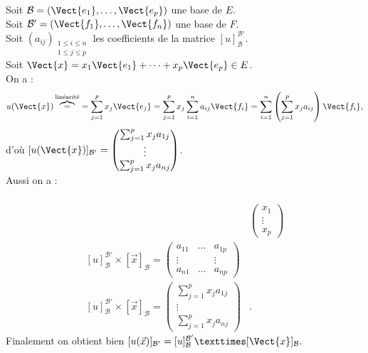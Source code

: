 \documentclass{book}
\begin{document}
\begin{Demonstration}
Soit $\mathcal{B}=(\Vect{e_1},\dots,\Vect{e_p})$ une base de $E$.\\
Soit $\mathcal{B}'=(\Vect{f_1},\dots,\Vect{f_n})$ une base de $F$.\\
Soit $(a_{ij})_{\substack{1\leq i\leq n\\1\leq j\leq p}}$ les coefficients de la matrice $[u]_\mathcal{B}^{\mathcal{B}'}$.\\
Soit $\Vect{x}=x_1\Vect{e_1}+\dots+x_p\Vect{e_p}\in E$.\\
On a :
$$u(\Vect{x})\overbrace{=}^{\text{linéarité}} =\sum_{j=1}^p x_j\Vect{e_j}=\sum_{j=1}^p x_j\sum_{i=1}^n a_{ij} \Vect{f_i}=\sum_{i=1}^n \left(\sum_{j=1}^p x_j a_{ij}\right) \Vect{f_i}, $$
d'où $ [u(\Vect{x})]_{\mathcal{B}'}=\begin{pmatrix}\sum_{j=1}^p x_j a_{1j} \\\vdots\\\sum_{j=1}^p x_j a_{nj} \end{pmatrix}$.\\
Aussi on a :

$$\begin{aligned}\\
 &\begin{pmatrix}x_1\\\vdots\\x_p\end{pmatrix} \\
\left[u\right]_{\mathcal{B}}^{\mathcal{B}'} \times \left[\vec{x}\right]_{\mathcal{B}}=\begin{pmatrix}
    a_{11} &  \dots & a_{1p}  \\
    \vdots &   &  \vdots  \\
    a_{n1} &  \dots & a_{np}
  \end{pmatrix}& \\
\left[u\right]_{\mathcal{B}}^{\mathcal{B}'} \times \left[\vec{x}\right]_{\mathcal{B}}=\begin{pmatrix}\sum_{j=1}^p x_j a_{1j} \\\vdots\\\sum_{j=1}^p x_j a_{nj} \end{pmatrix}&.
\end{aligned}$$
Finalement on obtient bien $ [u(\vec{x})]_{\mathcal{B}'} = [u]_\mathcal{B}^{\mathcal{B}'} × [\Vect{x}]_\mathcal{B}. $
\end{Demonstration}
\end{document}
